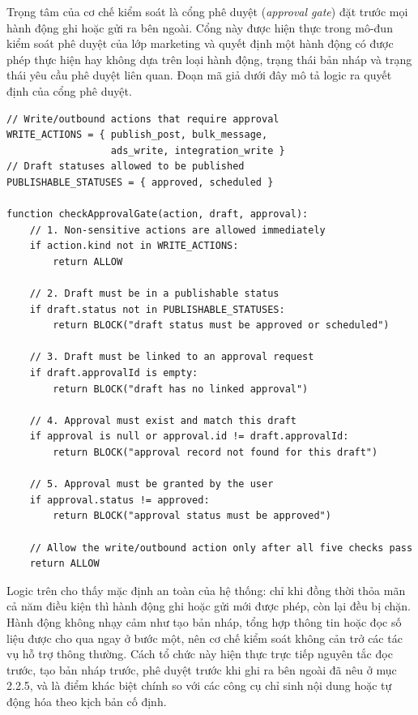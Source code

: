 \documentclass[a4paper]{article}
\begin{document}
Trọng tâm của cơ chế kiểm soát là cổng phê duyệt (\textit{approval gate}) đặt trước mọi hành động ghi hoặc gửi ra bên ngoài. Cổng này được hiện thực trong mô-đun kiểm soát phê duyệt của lớp marketing và quyết định một hành động có được phép thực hiện hay không dựa trên loại hành động, trạng thái bản nháp và trạng thái yêu cầu phê duyệt liên quan. Đoạn mã giả dưới đây mô tả logic ra quyết định của cổng phê duyệt.

\begin{lstlisting}[caption={Logic ra quyết định của cổng phê duyệt (approval gate)},captionpos=b]
// Write/outbound actions that require approval
WRITE_ACTIONS = { publish_post, bulk_message,
                  ads_write, integration_write }
// Draft statuses allowed to be published
PUBLISHABLE_STATUSES = { approved, scheduled }

function checkApprovalGate(action, draft, approval):
    // 1. Non-sensitive actions are allowed immediately
    if action.kind not in WRITE_ACTIONS:
        return ALLOW

    // 2. Draft must be in a publishable status
    if draft.status not in PUBLISHABLE_STATUSES:
        return BLOCK("draft status must be approved or scheduled")

    // 3. Draft must be linked to an approval request
    if draft.approvalId is empty:
        return BLOCK("draft has no linked approval")

    // 4. Approval must exist and match this draft
    if approval is null or approval.id != draft.approvalId:
        return BLOCK("approval record not found for this draft")

    // 5. Approval must be granted by the user
    if approval.status != approved:
        return BLOCK("approval status must be approved")

    // Allow the write/outbound action only after all five checks pass
    return ALLOW
\end{lstlisting}

Logic trên cho thấy mặc định an toàn của hệ thống: chỉ khi đồng thời thỏa mãn cả năm điều kiện thì hành động ghi hoặc gửi mới được phép, còn lại đều bị chặn. Hành động không nhạy cảm như tạo bản nháp, tổng hợp thông tin hoặc đọc số liệu được cho qua ngay ở bước một, nên cơ chế kiểm soát không cản trở các tác vụ hỗ trợ thông thường. Cách tổ chức này hiện thực trực tiếp nguyên tắc đọc trước, tạo bản nháp trước, phê duyệt trước khi ghi ra bên ngoài đã nêu ở mục 2.2.5, và là điểm khác biệt chính so với các công cụ chỉ sinh nội dung hoặc tự động hóa theo kịch bản cố định.
\end{document}
